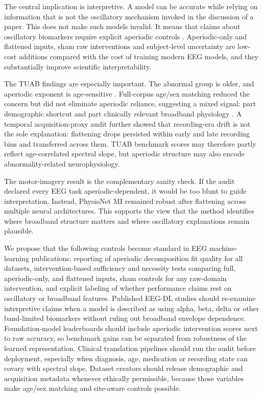 \documentclass[pdflatex,sn-nature]{sn-jnl}
\begin{document}
The central implication is interpretive. A model can be accurate while relying on information that is not the oscillatory mechanism invoked in the discussion of a paper. This does not make such models invalid. It means that claims about oscillatory biomarkers require explicit aperiodic controls \cite{donoghue2020parameterizing,gao2017inferring}. Aperiodic-only and flattened inputs, sham raw interventions and subject-level uncertainty are low-cost additions compared with the cost of training modern EEG models, and they substantially improve scientific interpretability.

The TUAB findings are especially important. The abnormal group is older, and aperiodic exponent is age-sensitive \cite{voytek2015age,demuru2020fingerprinting}. Full-corpus age/sex matching reduced the concern but did not eliminate aperiodic reliance, suggesting a mixed signal: part demographic shortcut and part clinically relevant broadband physiology \cite{brake2024neurophysiological}. A temporal acquisition-proxy audit further showed that recording-era drift is not the sole explanation: flattening drops persisted within early and late recording bins and transferred across them. TUAB benchmark scores may therefore partly reflect age-correlated spectral slope, but aperiodic structure may also encode abnormality-related neurophysiology.

The motor-imagery result is the complementary sanity check. If the audit declared every EEG task aperiodic-dependent, it would be too blunt to guide interpretation. Instead, PhysioNet MI remained robust after flattening across multiple neural architectures. This supports the view that the method identifies where broadband structure matters and where oscillatory explanations remain plausible.

We propose that the following controls become standard in EEG machine-learning publications: reporting of aperiodic decomposition fit quality for all datasets, intervention-based sufficiency and necessity tests comparing full, aperiodic-only, and flattened inputs, sham controls for any raw-domain intervention, and explicit labeling of whether performance claims rest on oscillatory or broadband features. Published EEG-DL studies should re-examine interpretive claims when a model is described as using alpha, beta, delta or other band-limited biomarkers without ruling out broadband envelope dependence. Foundation-model leaderboards should include aperiodic intervention scores next to raw accuracy, so benchmark gains can be separated from robustness of the learned representation. Clinical translation pipelines should run the audit before deployment, especially when diagnosis, age, medication or recording state can covary with spectral slope. Dataset creators should release demographic and acquisition metadata whenever ethically permissible, because those variables make age/sex matching and site-aware controls possible.
\end{document}
